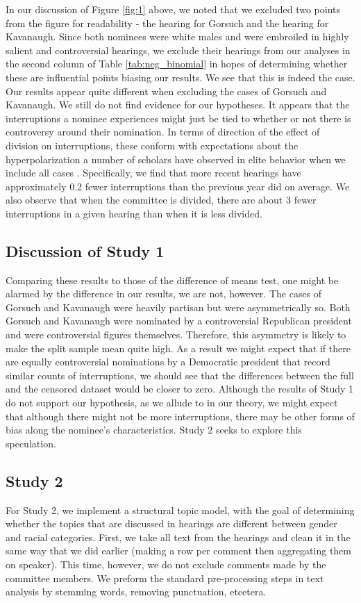 \documentclass [12pt]{article}
\begin{document}
In our discussion of Figure \ref{fig:1} above, we noted that we excluded two points from the figure for readability - the hearing for Gorsuch and the hearing for Kavanaugh. Since both nominees were white males and were embroiled in highly salient and controversial hearings, we exclude their hearings from our analyses in the second column of Table \ref{tab:neg_binomial} in hopes of determining whether these are influential points biasing our results. We see that this is indeed the case. Our results appear quite different when excluding the cases of Gorsuch and Kavanaugh. We still do not find evidence for our hypotheses. It appears that the interruptions a nominee experiences might just be tied to whether or not there is controversy around their nomination. In terms of direction of the effect of division on interruptions, these conform with expectations about the hyperpolarization a number of scholars have observed in elite behavior when we include all cases \citep{mccarty_et-al_2005, ramey_2017, enders_2020}. Specifically, we find that more recent hearings have approximately 0.2 fewer interruptions than the previous year did on average. We also observe that when the committee is divided, there are about 3 fewer interruptions in a given hearing than when it is less divided. 
	    
\subsection{Discussion of Study 1}
	    
Comparing these results to those of the difference of means test, one might be alarmed by the difference in our results, we are not, however. The cases of Gorsuch and Kavanaugh were heavily partisan but were asymmetrically so. Both Gorsuch and Kavanaugh were nominated by a controversial Republican president and were controversial figures themselves. Therefore, this asymmetry is likely to make the split sample mean quite high. As a result we might expect that if there are equally controversial nominations by a Democratic president that record similar counts of interruptions, we should see that the differences between the full and the censored dataset would be closer to zero. Although the results of Study 1 do not support our hypothesis, as we allude to in our theory, we might expect that although there might not be more interruptions, there may be other forms of bias along the nominee's characteristics. Study 2 seeks to explore this speculation.
	    
\subsection{Study 2}
For Study 2, we implement a structural topic model, with the goal of determining whether the topics that are discussed in hearings are different between gender and racial categories. First, we take all text from the hearings and clean it in the same way that we did earlier (making a row per comment then aggregating them on speaker). This time, however, we do not exclude comments made by the committee members. We preform the standard pre-processing steps in text analysis by stemming words, removing punctuation, etcetera. 
	    
\end{document}
